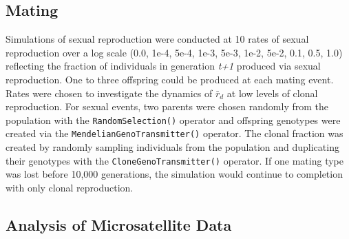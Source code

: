 \documentclass[double,11pt]{beavtex}
\begin{document}
  \subsection{Mating}\label{mating}
  
  Simulations of sexual reproduction were conducted at 10 rates of sexual
  reproduction over a log scale (0.0, 1e-4, 5e-4, 1e-3, 5e-3, 1e-2, 5e-2,
  0.1, 0.5, 1.0) reflecting the fraction of individuals in generation
  \emph{t+1} produced via sexual reproduction. One to three offspring
  could be produced at each mating event. Rates were chosen to investigate
  the dynamics of \(\bar{r}_d\) at low levels of clonal reproduction. For
  sexual events, two parents were chosen randomly from the population with
  the \texttt{RandomSelection()} operator and offspring genotypes were
  created via the \texttt{MendelianGenoTransmitter()} operator. The clonal
  fraction was created by randomly sampling individuals from the
  population and duplicating their genotypes with the
  \texttt{CloneGenoTransmitter()} operator. If one mating type was lost
  before 10,000 generations, the simulation would continue to completion
  with only clonal reproduction.
  
  \subsection{Analysis of Microsatellite
  Data}\label{analysis-of-microsatellite-data}
  
\end{document}
